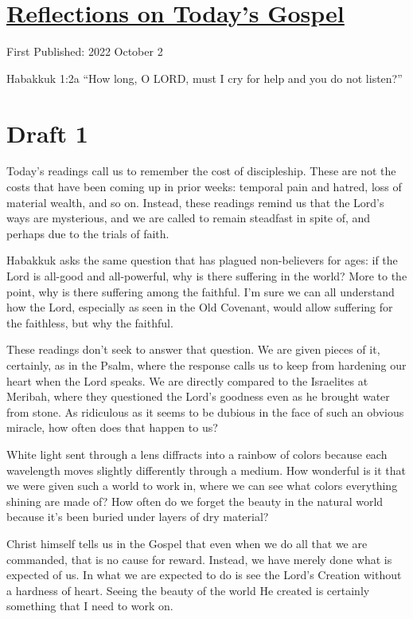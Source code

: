 \documentclass[12pt]{article}[titlepage]
\newcommand{\say}[1]{``#1''}
\newcommand{\1}{\={a}}
\newcommand{\2}{\={e}}
\newcommand{\3}{\={\i}}
\newcommand{\4}{\=o}
\newcommand{\5}{\=u}
\newcommand{\6}{\={A}}
\renewcommand{\,}{\textsuperscript{,}}
\begin{document}
\doublespacing
\section{\href{reflections-on-readings-27-ordinary-c-22.html}{Reflections on Today's Gospel}}
First Published: 2022 October 2

Habakkuk 1:2a \say{How long, O LORD, must I cry for help
and you do not listen?}

\section{Draft 1}
Today's readings call us to remember the cost of discipleship.
These are not the costs that have been coming up in prior weeks: temporal pain and hatred, loss of material wealth, and so on.
Instead, these readings remind us that the Lord's ways are mysterious, and we are called to remain steadfast in spite of, and perhaps due to the trials of faith.

Habakkuk asks the same question that has plagued non-believers for ages: if the Lord is all-good and all-powerful, why is there suffering in the world?
More to the point, why is there suffering among the faithful.
I'm sure we can all understand how the Lord, especially as seen in the Old Covenant, would allow suffering for the faithless, but why the faithful.

These readings don't seek to answer that question.
We are given pieces of it, certainly, as in the Psalm, where the response calls us to keep from hardening our heart when the Lord speaks.
We are directly compared to the Israelites at Meribah, where they questioned the Lord's goodness even as he brought water from stone.
As ridiculous as it seems to be dubious in the face of such an obvious miracle, how often does that happen to us?

White light sent through a lens diffracts into a rainbow of colors because each wavelength moves slightly differently through a medium.
How wonderful is it that we were given such a world to work in, where we can see what colors everything shining are made of?
How often do we forget the beauty in the natural world because it's been buried under layers of dry material?

Christ himself tells us in the Gospel that even when we do all that we are commanded, that is no cause for reward.
Instead, we have merely done what is expected of us.
In what we are expected to do is see the Lord's Creation without a hardness of heart.
Seeing the beauty of the world He created is certainly something that I need to work on.
\end{document}
